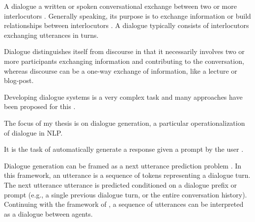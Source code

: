 


A dialogue a written or spoken conversational exchange between two or more interlocutors . Generally speaking, its purpose is to exchange information or build relationships between interlocutors \citep{bohm2013dialogue}. A dialogue typically consists of interlocutors exchanging utterances in turns. 


Dialogue distinguishes itself from discourse in that it necessarily involves two or more participants exchanging information and contributing to the conversation, whereas discourse can be a one-way exchange of information, like a lecture or blog-post. 

Developing dialogue systems is a very complex task and many approaches have been proposed for this \citep{mctear2020conversational}. 

The focus of my thesis is on dialogue generation, a particular operationalization of dialogue in NLP. 

It is the task of automatically generate a response given a prompt by the user \citep{madotto-etal-2020-plug}.

Dialogue generation can be framed as a next utterance prediction problem \citep{welleck-etal-2019-dialogue}. In this framework, an utterance is a sequence of tokens representing a dialogue turn. The next utterance utterance is predicted conditioned on a dialogue prefix or prompt (e.g., a single previous dialogue turn, or the entire conversation history). Continuing with the framework of \cite{welleck-etal-2019-dialogue}, a sequence of utterances can be interpreted as a dialogue between agents.

